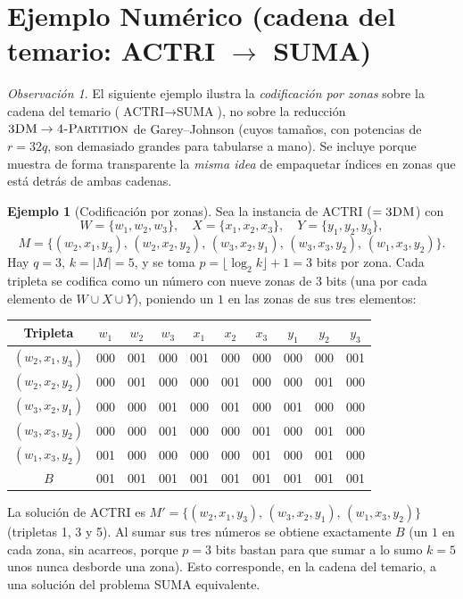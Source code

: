 \documentclass[12pt,a4paper]{article}
\theoremstyle{definition}
\newtheorem{example}{Ejemplo}
\theoremstyle{remark}
\newtheorem{remark}{Observación}
\newcommand{\FPART}{\textsc{4-Partition}}
\newcommand{\DM}{\textsc{3DM}}
\begin{document}
\section{Ejemplo Numérico (cadena del temario: ACTRI $\to$ SUMA)}

\begin{remark}
El siguiente ejemplo ilustra la \emph{codificación por zonas} sobre la cadena del
temario ($\text{ACTRI} \to \text{SUMA}$), no sobre la reducción
$\DM \to \FPART$ de Garey--Johnson (cuyos tamaños, con potencias de $r=32q$, son
demasiado grandes para tabularse a mano). Se incluye porque muestra de forma
transparente la \emph{misma idea} de empaquetar índices en zonas que está detrás de
ambas cadenas.
\end{remark}

\begin{example}[Codificación por zonas]
Sea la instancia de ACTRI ($=\DM$) con
\[
  W = \{w_1, w_2, w_3\},\quad X = \{x_1, x_2, x_3\},\quad Y = \{y_1, y_2, y_3\},
\]
\[
  M = \{(w_2,x_1,y_3),\, (w_2,x_2,y_2),\, (w_3,x_2,y_1),\,
        (w_3,x_3,y_2),\, (w_1,x_3,y_2)\}.
\]
Hay $q=3$, $k = |M| = 5$, y se toma $p = \lfloor \log_2 k \rfloor + 1 = 3$ bits por
zona. Cada tripleta se codifica como un número con nueve zonas de 3 bits (una por
cada elemento de $W \cup X \cup Y$), poniendo un $1$ en las zonas de sus tres
elementos:

\smallskip
\begin{center}
\begin{tabular}{cccccccccc}
\toprule
Tripleta & $w_1$ & $w_2$ & $w_3$ & $x_1$ & $x_2$ & $x_3$
         & $y_1$ & $y_2$ & $y_3$ \\
\midrule
$(w_2,x_1,y_3)$ & 000 & 001 & 000 & 001 & 000 & 000 & 000 & 000 & 001 \\
$(w_2,x_2,y_2)$ & 000 & 001 & 000 & 000 & 001 & 000 & 000 & 001 & 000 \\
$(w_3,x_2,y_1)$ & 000 & 000 & 001 & 000 & 001 & 000 & 001 & 000 & 000 \\
$(w_3,x_3,y_2)$ & 000 & 000 & 001 & 000 & 000 & 001 & 000 & 001 & 000 \\
$(w_1,x_3,y_2)$ & 001 & 000 & 000 & 000 & 000 & 001 & 000 & 001 & 000 \\
\midrule
$B$             & 001 & 001 & 001 & 001 & 001 & 001 & 001 & 001 & 001 \\
\bottomrule
\end{tabular}
\end{center}

\smallskip\noindent
La solución de ACTRI es $M' = \{(w_2,x_1,y_3),\,(w_3,x_2,y_1),\,(w_1,x_3,y_2)\}$
(tripletas 1, 3 y 5). Al sumar sus tres números se obtiene exactamente $B$ (un $1$
en cada zona, sin acarreos, porque $p=3$ bits bastan para que sumar a lo sumo $k=5$
unos nunca desborde una zona). Esto corresponde, en la cadena del temario, a una
solución del problema SUMA equivalente.
\end{example}
\end{document}
